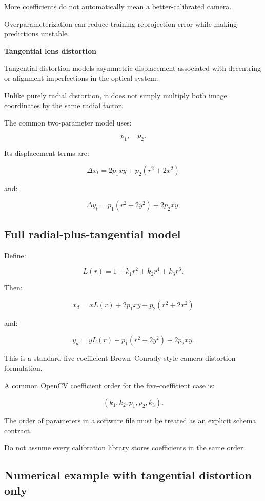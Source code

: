 More coefficients do not automatically mean a better-calibrated camera.

Overparameterization can reduce training reprojection error while making predictions unstable.

\textbf{Tangential lens distortion}

Tangential distortion models asymmetric displacement associated with decentring or alignment imperfections in the optical system.

Unlike purely radial distortion, it does not simply multiply both image coordinates by the same radial factor.

The common two-parameter model uses:

\[
 p_1,\quad p_2.
\]

Its displacement terms are:

\[
 \boxed{ \Delta x_t= 2p_1xy+p_2(r^2+2x^2) }
\]

and:

\[
 \boxed{ \Delta y_t= p_1(r^2+2y^2)+2p_2xy }.
\]

\subsection{Full radial-plus-tangential model}\label{02-foundations-ii-ch035-full-radial-plus-tangential-model}

Define:

\[
 L(r)=1+k_1r^2+k_2r^4+k_3r^6.
\]

Then:

\[
 \boxed{ x_d= xL(r)+2p_1xy+p_2(r^2+2x^2) }
\]

and:

\[
 \boxed{ y_d= yL(r)+p_1(r^2+2y^2)+2p_2xy }.
\]

This is a standard five-coefficient Brown--Conrady-style camera distortion formulation.

A common OpenCV coefficient order for the five-coefficient case is:

\[
 \boxed{ (k_1,k_2,p_1,p_2,k_3) }.
\]

The order of parameters in a software file must be treated as an explicit schema contract.

Do not assume every calibration library stores coefficients in the same order.

\subsection{Numerical example with tangential distortion only}\label{02-foundations-ii-ch035-numerical-example-with-tangential-distortion-only}

